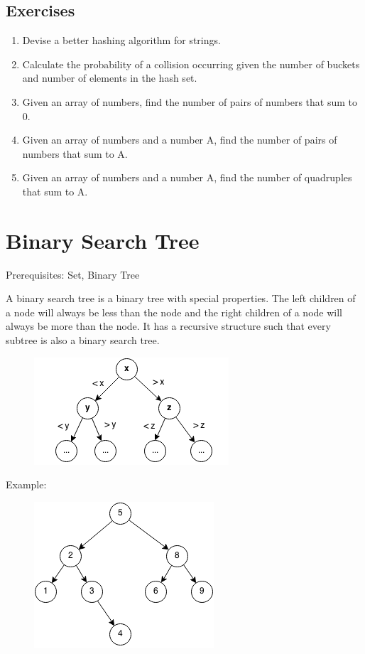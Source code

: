 \documentclass[11pt,oneside]{book}
\makeatletter
\def\maxwidth#1{\ifdim\Gin@nat@width>#1 #1\else\Gin@nat@width\fi}
\makeatother
\begin{document}
\subsection{Exercises}

\begin{enumerate}
\item Devise a better hashing algorithm for strings.
\item Calculate the probability of a collision occurring given the number of buckets and number of elements in the hash set.
\item Given an array of numbers, find the number of pairs of numbers that sum to 0.
\item Given an array of numbers and a number A, find the number of pairs of numbers that sum to A.
\item Given an array of numbers and a number A, find the number of quadruples that sum to A.
\end{enumerate}

        \section{ Binary Search Tree }
        

Prerequisites: Set, Binary Tree

A binary search tree is a  binary tree with special properties. The left children of a node will always be less than the node and the right children of a node will always be more than the node. It has a recursive structure such that every subtree is also a binary search tree.

\vspace{5px}\begin{figure}[H]\centering
        \includegraphics[width=0.66\maxwidth{\textwidth}]{bstcompare.png}
        \end{figure}

Example:

\vspace{5px}\begin{figure}[H]\centering
        \includegraphics[width=0.66\maxwidth{\textwidth}]{bst.png}
        \end{figure}
\end{document}
